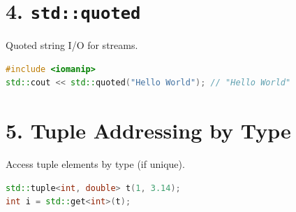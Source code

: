 \hypertarget{stdquoted}{%
\section{\texorpdfstring{4.
\texttt{std::quoted}}{4. std::quoted}}\label{stdquoted}}

Quoted string I/O for streams.

\begin{lstlisting}[language={C++}]
#include <iomanip>
std::cout << std::quoted("Hello World"); // "Hello World"
\end{lstlisting}

\hypertarget{tuple-addressing-by-type}{%
\section{5. Tuple Addressing by Type}\label{tuple-addressing-by-type}}

Access tuple elements by type (if unique).

\begin{lstlisting}[language={C++}]
std::tuple<int, double> t(1, 3.14);
int i = std::get<int>(t);
\end{lstlisting}
